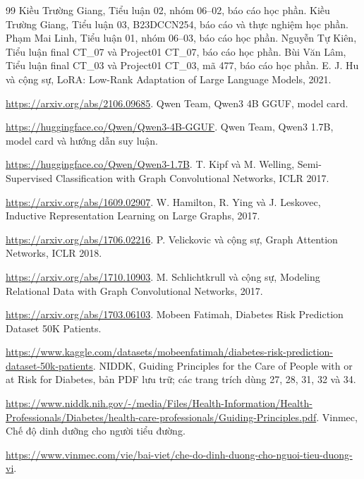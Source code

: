 \begingroup\small{}
\begin{thebibliography}{99}
 Kiều Trường Giang, Tiểu luận 02, nhóm 06--02, báo cáo học phần.
 Kiều Trường Giang, Tiểu luận 03, B23DCCN254, báo cáo và thực nghiệm học phần.
 Phạm Mai Linh, Tiểu luận 01, nhóm 06--03, báo cáo học phần.
 Nguyễn Tự Kiên, Tiểu luận final CT\_07 và Project01 CT\_07, báo cáo học phần.
 Bùi Văn Lâm, Tiểu luận final CT\_03 và Project01 CT\_03, mã 477, báo cáo học phần.
 E. J. Hu và cộng sự, LoRA: Low-Rank Adaptation of Large Language Models, 2021.\par\noindent\url{https://arxiv.org/abs/2106.09685}.
 Qwen Team, Qwen3 4B GGUF, model card.\par\noindent\url{https://huggingface.co/Qwen/Qwen3-4B-GGUF}.
 Qwen Team, Qwen3 1.7B, model card và hướng dẫn suy luận.\par\noindent\url{https://huggingface.co/Qwen/Qwen3-1.7B}.
 T. Kipf và M. Welling, Semi-Supervised Classification with Graph Convolutional Networks, ICLR 2017.\par\noindent\url{https://arxiv.org/abs/1609.02907}.
 W. Hamilton, R. Ying và J. Leskovec, Inductive Representation Learning on Large Graphs, 2017.\par\noindent\url{https://arxiv.org/abs/1706.02216}.
 P. Velickovic và cộng sự, Graph Attention Networks, ICLR 2018.\par\noindent\url{https://arxiv.org/abs/1710.10903}.
 M. Schlichtkrull và cộng sự, Modeling Relational Data with Graph Convolutional Networks, 2017.\par\noindent\url{https://arxiv.org/abs/1703.06103}.
 Mobeen Fatimah, Diabetes Risk Prediction Dataset 50K Patients.\par\noindent\url{https://www.kaggle.com/datasets/mobeenfatimah/diabetes-risk-prediction-dataset-50k-patients}.
 NIDDK, Guiding Principles for the Care of People with or at Risk for Diabetes, bản PDF lưu trữ; các trang trích dùng 27, 28, 31, 32 và 34.\par\noindent\url{https://www.niddk.nih.gov/-/media/Files/Health-Information/Health-Professionals/Diabetes/health-care-professionals/Guiding-Principles.pdf}.
 Vinmec, Chế độ dinh dưỡng cho người tiểu đường.\par\noindent\url{https://www.vinmec.com/vie/bai-viet/che-do-dinh-duong-cho-nguoi-tieu-duong-vi}.
\end{thebibliography}

\endgroup